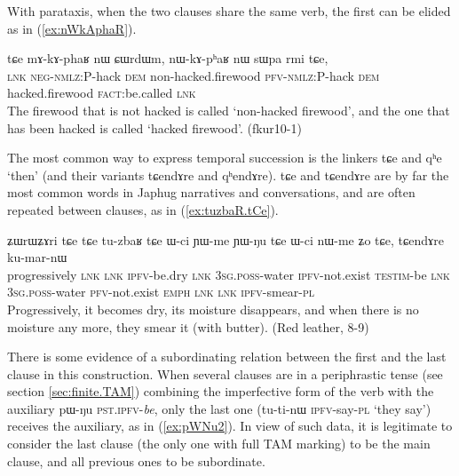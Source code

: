 \documentclass[oldfontcommands,oneside,a4paper,11pt]{article}
\newcommand{\ipa}[1]{{\phon \mbox{#1}}} %
\newcommand{\refb}[1]{(\ref{#1})}
\begin{document}
With parataxis, when the two clauses share the same verb, the first can be elided as in \refb{ex:nWkAphaR}.

\begin{exe}
\ex \label{ex:nWkAphaR}
\gll 
\ipa{tɕe}  	\ipa{mɤ-kɤ-phaʁ}  	\ipa{nɯ}  	\ipa{ɕɯrdɯm,}  	\ipa{nɯ-kɤ-pʰaʁ}  	\ipa{nɯ}  	\ipa{sɯpa}  	\ipa{rmi}  	\ipa{tɕe,}  	\\
\textsc{lnk} \textsc{neg-nmlz:}P-hack \textsc{dem} non-hacked.firewood \textsc{pfv-nmlz:}P-hack \textsc{dem} hacked.firewood \textsc{fact}:be.called \textsc{lnk} \\
\glt The firewood that is not hacked is called `non-hacked firewood', and the one that has been hacked is called `hacked firewood'. (fkur10-1)
\end{exe}

The most common way to express temporal succession is the linkers \ipa{tɕe} and \ipa{qʰe} `then' (and their variants \ipa{tɕendɤre} and \ipa{qʰendɤre}). \ipa{tɕe}   and \ipa{tɕendɤre} are by far the most common words in Japhug narratives and conversations, and are often repeated between clauses, as in \refb{ex:tuzbaR.tCe}. 

\begin{exe}
\ex \label{ex:tuzbaR.tCe}
\gll 
\ipa{ʑɯrɯʑɤri}  	\ipa{tɕe}  	\ipa{tɕe}  	\ipa{tu-zbaʁ}  	\ipa{tɕe}  	\ipa{ɯ-ci}  	\ipa{ɲɯ-me}  	\ipa{ɲɯ-ŋu}  	\ipa{tɕe}  	\ipa{ɯ-ci}  	\ipa{nɯ-me}  	\ipa{ʑo}  	\ipa{tɕe,}  	\ipa{tɕendɤre}  	\ipa{ku-mar-nɯ}  \\
progressively \textsc{lnk}  \textsc{lnk} \textsc{ipfv}-be.dry   \textsc{lnk}  \textsc{3sg.poss}-water \textsc{ipfv}-not.exist \textsc{testim}-be \textsc{lnk} \textsc{3sg.poss}-water \textsc{pfv}-not.exist \textsc{emph} \textsc{lnk}  \textsc{lnk} \textsc{ipfv}-smear-\textsc{pl} \\
\glt Progressively, it becomes dry, its moisture  disappears, and when there is no moisture any more, they smear it (with butter). (Red leather, 8-9)
\end{exe}

There is some evidence of a subordinating relation between the first and the last clause in this construction. When several clauses are in a periphrastic tense (see section \ref{sec:finite.TAM}) combining the imperfective form of the verb with the auxiliary \ipa{pɯ-ŋu} \textsc{pst.ipfv}-\textit{be}, only the last one (\ipa{tu-ti-nɯ}  \textsc{ipfv}-say-\textsc{pl} `they  say') receives the auxiliary, as in \refb{ex:pWNu2}. In view of such data, it is legitimate to consider the last clause (the only one with full TAM marking) to  be the main clause, and all previous ones to be subordinate.
\end{document}
